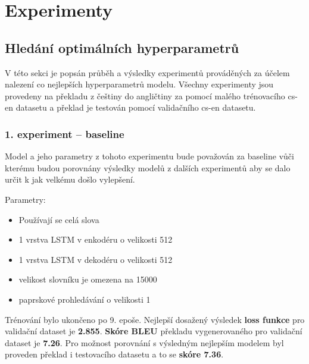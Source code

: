 \section{Experimenty}

\subsection{Hledání optimálních hyperparametrů}\label{subsection:experimentsOptimal}
V této sekci je popsán průběh a výsledky experimentů prováděných za účelem nalezení co nejlepších hyperparametrů modelu. Všechny experimenty jsou provedeny na překladu z češtiny do angličtiny za pomocí malého trénovacího cs-en datasetu a překlad je testován pomocí validačního cs-en datasetu.

\subsubsection{1. experiment -- baseline}\label{experiment1}
Model a jeho parametry z tohoto experimentu bude považován za baseline vůči kterému budou porovnány výsledky modelů z dalších experimentů aby se dalo určit k jak velkému došlo vylepšení.

Parametry:
\begin{itemize}
  \item Používají se celá slova
  \item 1 vrstva LSTM v enkodéru o velikosti 512
  \item 1 vrstva LSTM v dekodéru o velikosti 512
  \item velikost slovníku je omezena na 15000
  \item paprskové prohledávání o velikosti 1
\end{itemize}

Trénování bylo ukončeno po 9. epoše. Nejlepší dosažený výsledek \textbf{loss funkce} pro validační dataset je \textbf{2.855}. \textbf{Skóre BLEU} překladu vygenerovaného pro validační dataset je \textbf{7.26}. Pro možnost porovnání s výsledným nejlepším modelem byl proveden překlad i testovacího datasetu a to se \textbf{skóre 7.36}.

